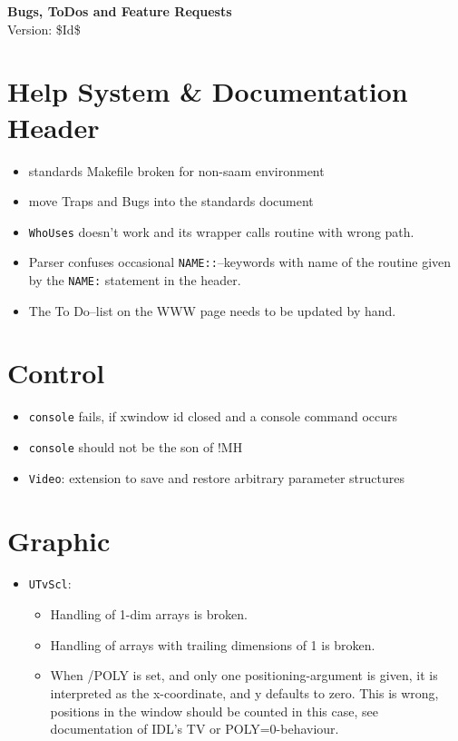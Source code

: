 \documentclass[12pt]{article}
\begin{document}
\begin{center}
{\Huge\textbf{Bugs, ToDos and Feature Requests}}\\[2cm]
Version: \$Id$ $\$ 
\end{center}

\section{Help System \& Documentation Header} 

\begin{itemize}
\item standards Makefile broken for non-saam environment
\item move Traps and Bugs into the standards document
\item \texttt{WhoUses} doesn't work and its wrapper calls routine with wrong path.
\item Parser confuses occasional \texttt{NAME::}--keywords with name
  of the routine given by the \texttt{NAME:} statement in the header.
\item The To Do--list on the WWW page needs to be updated by hand.
\end{itemize}



\section{Control}
\begin{itemize}
\item \texttt{console} fails, if xwindow id closed and a console command occurs
\item \texttt{console} should not be the son of !MH
\item \texttt{Video}: extension to save and restore arbitrary parameter structures
\end{itemize}


\section{Graphic}
\begin{itemize}
\item \texttt{UTvScl}:
\begin{itemize}
  \item Handling of 1-dim arrays is broken.
  \item Handling of arrays with trailing dimensions of 1 is broken.
  \item When /POLY is set, and only one positioning-argument is given,
    it is interpreted as the x-coordinate, and y defaults to zero.
    This is wrong, positions in the window should be counted in this
    case, see documentation of IDL's TV or POLY=0-behaviour.
\end{itemize}
\end{itemize}
\end{document}
